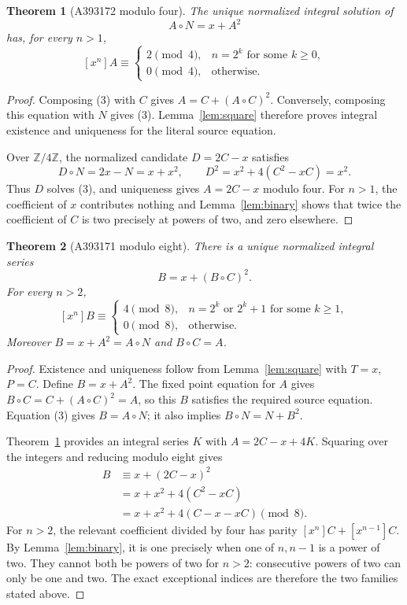 \documentclass[11pt,a4paper]{article}
\newtheorem{theorem}{Theorem}[section]
\theoremstyle{remark}
\newcommand{\Z}{\mathbb Z}
\begin{document}
\begin{theorem}[A393172 modulo four]\label{thm:catalanfour}
The unique normalized integral solution of
\[
 A\circ N=x+A^2 \tag{3}
\]
has, for every $n>1$,
\[
 [x^n]A\equiv
 \begin{cases}
 2\pmod4,& n=2^k\text{ for some }k\ge0,\\
 0\pmod4,& \text{otherwise}.
 \end{cases}
\]
\end{theorem}

\begin{proof}
Composing (3) with $C$ gives
$A=C+(A\circ C)^2$. Conversely, composing this equation with $N$
gives (3). Lemma~\ref{lem:square} therefore proves integral existence
and uniqueness for the literal source equation.

Over $\Z/4\Z$, the normalized candidate $D=2C-x$ satisfies
\[
 D\circ N=2x-N=x+x^2,
 \qquad D^2=x^2+4(C^2-xC)=x^2.
\]
Thus $D$ solves (3), and uniqueness gives $A=2C-x$ modulo four. For
$n>1$, the coefficient of $x$ contributes nothing and Lemma~\ref{lem:binary}
shows that twice the coefficient of $C$ is two precisely at powers of
two, and zero elsewhere.
\end{proof}

\begin{theorem}[A393171 modulo eight]\label{thm:catalaneight}
There is a unique normalized integral series
\[
 B=x+(B\circ C)^2.
\]
For every $n>2$,
\[
 [x^n]B\equiv
 \begin{cases}
 4\pmod8,& n=2^k\text{ or }2^k+1\text{ for some }k\ge1,\\
 0\pmod8,& \text{otherwise}.
 \end{cases}
\]
Moreover $B=x+A^2=A\circ N$ and $B\circ C=A$.
\end{theorem}

\begin{proof}
Existence and uniqueness follow from Lemma~\ref{lem:square} with $T=x$,
$P=C$. Define $B=x+A^2$. The fixed point equation for $A$ gives
$B\circ C=C+(A\circ C)^2=A$, so this $B$ satisfies the required source
equation. Equation (3) gives $B=A\circ N$; it also implies
$B\circ N=N+B^2$.

Theorem~\ref{thm:catalanfour} provides an integral series $K$ with
$A=2C-x+4K$. Squaring over the integers and reducing modulo eight gives
\[
 \begin{aligned}
 B&\equiv x+(2C-x)^2\\
  & =x+x^2+4(C^2-xC)\\
  & =x+x^2+4(C-x-xC)\pmod8.
 \end{aligned}\tag{4}
\]
For $n>2$, the relevant coefficient divided by four has parity
$[x^n]C+[x^{n-1}]C$. By Lemma~\ref{lem:binary}, it is one precisely
when one of $n,n-1$ is a power of two. They cannot both be powers of two
for $n>2$: consecutive powers of two can only be one and two. The exact
exceptional indices are therefore the two families stated above.
\end{proof}
\end{document}
